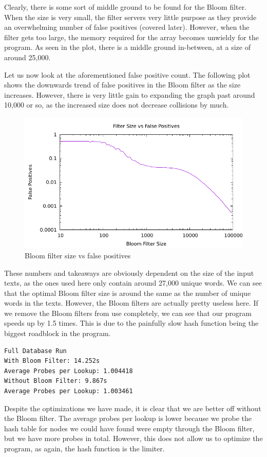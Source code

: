 \documentclass[12pt]{article}
\begin{document}
Clearly, there is some sort of middle ground to be found for the Bloom filter. When the size is very small, the filter servers very little purpose as they provide an overwhelming number of false positives (covered later). However, when the filter gets too large, the memory required for the array becomes unwieldy for the program. As seen in the plot, there is a middle ground in-between, at a size of around 25,000.

Let us now look at the aforementioned false positive count. The following plot shows the downwards trend of false positives in the Bloom filter as the size increases. However, there is very little gain to expanding the graph past around 10,000 or so, as the increased size does not decrease collisions by much.

\begin{figure}[H]\begin{centering}
\includegraphics{plots/false-positives.pdf}\caption{Bloom filter size vs false positives}
\end{centering}\end{figure}

These numbers and takeaways are obviously dependent on the size of the input texts, as the ones used here only contain around 27,000 unique words. We can see that the optimal Bloom filter size is around the same as the number of unique words in the texts. However, the Bloom filters are actually pretty useless here. If we remove the Bloom filters from use completely, we can see that our program speeds up by 1.5 times. This is due to the painfully slow hash function being the biggest roadblock in the program.
\begin{verbatim}
Full Database Run
With Bloom Filter: 14.252s
Average Probes per Lookup: 1.004418
Without Bloom Filter: 9.867s
Average Probes per Lookup: 1.003461
\end{verbatim}
Despite the optimizations we have made, it is clear that we are better off without the Bloom filter. The average probes per lookup is lower because we probe the hash table for nodes we could have found were empty through the Bloom filter, but we have more probes in total. However, this does not allow us to optimize the program, as again, the hash function is the limiter.
\end{document}
